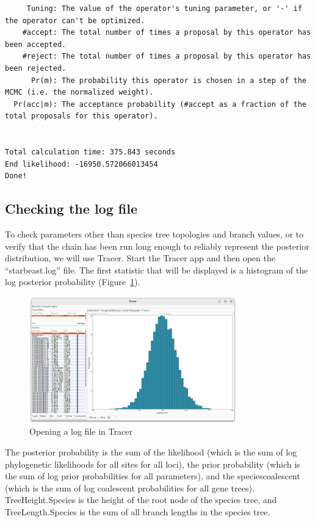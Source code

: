 \documentclass[12pt]{article}
\begin{document}
\begin{verbatim}
     Tuning: The value of the operator's tuning parameter, or '-' if the operator can't be optimized.
    #accept: The total number of times a proposal by this operator has been accepted.
    #reject: The total number of times a proposal by this operator has been rejected.
      Pr(m): The probability this operator is chosen in a step of the MCMC (i.e. the normalized weight).
  Pr(acc|m): The acceptance probability (#accept as a fraction of the total proposals for this operator).


Total calculation time: 375.843 seconds
End likelihood: -16950.572066013454
Done!\end{verbatim}

\subsection{Checking the log file}
\label{subsec:checkLog}

To check parameters other than species tree topologies and branch values, or to verify
that the chain has been run long enough to reliably represent the posterior distribution,
we will use Tracer. Start the Tracer app and then open the ``starbeast.log'' file.
The first statistic that will be displayed is a histogram of the log posterior probability
(Figure~\ref{fig:tracerPosterior}).

\begin{figure}[htb!]
\centering
\includegraphics[width=0.8\textwidth]{figures/tracerPosterior.png}
\caption
{Opening a log file in Tracer}
\label{fig:tracerPosterior}
\end{figure}

The posterior probability is the sum of the likelihood (which is the sum of
log phylogenetic likelihoods for all sites for all loci), the prior
probability (which is the sum of log prior probabilities for all parameters),
and the speciescoalescent (which is the sum of log coalescent probabilities for
all gene trees). TreeHeight.Species is the height of the root node of the
species tree, and TreeLength.Species is the sum of all branch lengths in the
species tree.
\end{document}
